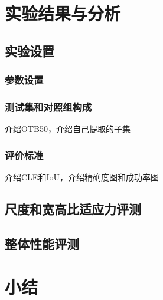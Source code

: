 \section{实验结果与分析}
\subsection{实验设置}
\subsubsection{参数设置}
\subsubsection{测试集和对照组构成}
介绍OTB50，介绍自己提取的子集
\subsubsection{评价标准}
介绍CLE和IoU，介绍精确度图和成功率图
\subsection{尺度和宽高比适应力评测}
\subsection{整体性能评测}

\section{小结}
